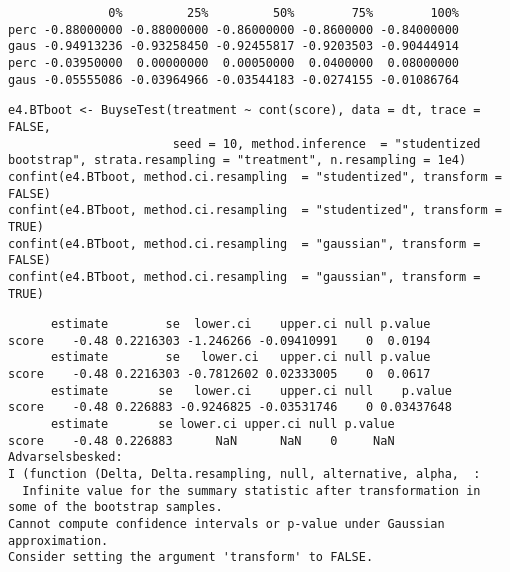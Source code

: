 \documentclass[12pt]{article}
\begin{document}
\begin{verbatim}
              0%         25%         50%        75%        100%
perc -0.88000000 -0.88000000 -0.86000000 -0.8600000 -0.84000000
gaus -0.94913236 -0.93258450 -0.92455817 -0.9203503 -0.90444914
perc -0.03950000  0.00000000  0.00050000  0.0400000  0.08000000
gaus -0.05555086 -0.03964966 -0.03544183 -0.0274155 -0.01086764
\end{verbatim}


\lstset{language=r,label= ,caption= ,captionpos=b,numbers=none}
\begin{lstlisting}
e4.BTboot <- BuyseTest(treatment ~ cont(score), data = dt, trace = FALSE,
                       seed = 10, method.inference  = "studentized bootstrap", strata.resampling = "treatment", n.resampling = 1e4)
confint(e4.BTboot, method.ci.resampling  = "studentized", transform = FALSE)
confint(e4.BTboot, method.ci.resampling  = "studentized", transform = TRUE)
confint(e4.BTboot, method.ci.resampling  = "gaussian", transform = FALSE)
confint(e4.BTboot, method.ci.resampling  = "gaussian", transform = TRUE)
\end{lstlisting}

\begin{verbatim}
      estimate        se  lower.ci    upper.ci null p.value
score    -0.48 0.2216303 -1.246266 -0.09410991    0  0.0194
      estimate        se   lower.ci   upper.ci null p.value
score    -0.48 0.2216303 -0.7812602 0.02333005    0  0.0617
      estimate       se   lower.ci    upper.ci null    p.value
score    -0.48 0.226883 -0.9246825 -0.03531746    0 0.03437648
      estimate       se lower.ci upper.ci null p.value
score    -0.48 0.226883      NaN      NaN    0     NaN
Advarselsbesked:
I (function (Delta, Delta.resampling, null, alternative, alpha,  :
  Infinite value for the summary statistic after transformation in some of the bootstrap samples. 
Cannot compute confidence intervals or p-value under Gaussian approximation. 
Consider setting the argument 'transform' to FALSE.
\end{verbatim}
\end{document}
